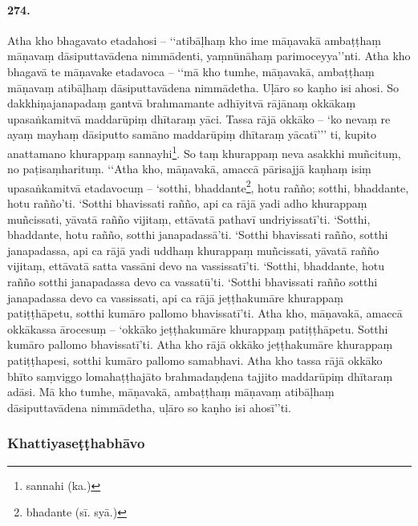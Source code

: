 \paragraph{274.} Atha kho bhagavato etadahosi – ‘‘atibāḷhaṃ kho ime māṇavakā ambaṭṭhaṃ māṇavaṃ dāsiputtavādena nimmādenti, yaṃnūnāhaṃ parimoceyya’’nti. Atha kho bhagavā te māṇavake etadavoca – ‘‘mā kho tumhe, māṇavakā, ambaṭṭhaṃ māṇavaṃ atibāḷhaṃ dāsiputtavādena nimmādetha. Uḷāro so kaṇho isi ahosi. So dakkhiṇajanapadaṃ gantvā brahmamante adhīyitvā rājānaṃ okkākaṃ upasaṅkamitvā maddarūpiṃ dhītaraṃ yāci. Tassa rājā okkāko – ‘ko nevaṃ re ayaṃ mayhaṃ dāsiputto samāno maddarūpiṃ dhītaraṃ yācatī’’’ ti, kupito anattamano khurappaṃ sannayhi\footnote{sannahi (ka.)}. So taṃ khurappaṃ neva asakkhi muñcituṃ, no paṭisaṃharituṃ. ‘‘Atha kho, māṇavakā, amaccā pārisajjā kaṇhaṃ isiṃ upasaṅkamitvā etadavocuṃ – ‘sotthi, bhaddante\footnote{bhadante (sī. syā.)}, hotu rañño; sotthi, bhaddante, hotu rañño’ti. ‘Sotthi bhavissati rañño, api ca rājā yadi adho khurappaṃ muñcissati, yāvatā rañño vijitaṃ, ettāvatā pathavī undriyissatī’ti. ‘Sotthi, bhaddante, hotu rañño, sotthi janapadassā’ti. ‘Sotthi bhavissati rañño, sotthi janapadassa, api ca rājā yadi uddhaṃ khurappaṃ muñcissati, yāvatā rañño vijitaṃ, ettāvatā satta vassāni devo na vassissatī’ti. ‘Sotthi, bhaddante, hotu rañño sotthi janapadassa devo ca vassatū’ti. ‘Sotthi bhavissati rañño sotthi janapadassa devo ca vassissati, api ca rājā jeṭṭhakumāre khurappaṃ patiṭṭhāpetu, sotthi kumāro pallomo bhavissatī’ti. Atha kho, māṇavakā, amaccā okkākassa ārocesuṃ – ‘okkāko jeṭṭhakumāre khurappaṃ patiṭṭhāpetu. Sotthi kumāro pallomo bhavissatī’ti. Atha kho rājā okkāko jeṭṭhakumāre khurappaṃ patiṭṭhapesi, sotthi kumāro pallomo samabhavi. Atha kho tassa rājā okkāko bhīto saṃviggo lomahaṭṭhajāto brahmadaṇḍena tajjito maddarūpiṃ dhītaraṃ adāsi. Mā kho tumhe, māṇavakā, ambaṭṭhaṃ māṇavaṃ atibāḷhaṃ dāsiputtavādena nimmādetha, uḷāro so kaṇho isi ahosī’’ti.

\subsubsection{Khattiyaseṭṭhabhāvo}

